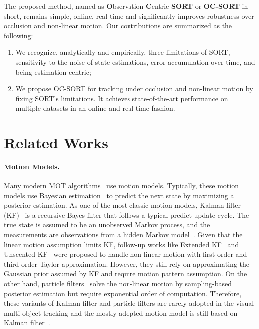 \documentclass[10pt,twocolumn,letterpaper]{article}
\begin{document}
The proposed method, named as \textbf{O}bservation-\textbf{C}entric \textbf{SORT} or \textbf{OC-SORT} in short, remains simple, online, real-time and significantly improves robustness over occlusion and non-linear motion.
Our contributions are summarized as the following: 
\begin{enumerate}
    \item We recognize, analytically and empirically, three limitations of SORT, \ie sensitivity to the noise of state estimations, error accumulation over time, and being estimation-centric; 
    \item We propose OC-SORT for tracking under occlusion and non-linear motion by fixing SORT's limitations. It achieves state-of-the-art performance on multiple datasets in an online and real-time fashion.
\end{enumerate}

\section{Related Works}
\paragraph{Motion Models.} Many modern MOT algorithms~\cite{bewley2016simple,tusimple,deepsort,centertrack,bytetrack} use motion models. Typically, these motion models use Bayesian estimation~\cite{bayes} to predict the next state by maximizing a posterior estimation. As one of the most classic motion models, Kalman filter (KF)~\cite{kalman1960contributions} is a recursive Bayes filter that follows a typical predict-update cycle. The true state is assumed to be an unobserved Markov process, and the measurements are observations from a hidden Markov model~\cite{hmm}.
Given that the linear motion assumption limits KF, follow-up works like Extended KF~\cite{ekf} and Unscented KF~\cite{ukf} were proposed to handle non-linear motion with first-order and third-order Taylor approximation. However, they still rely on approximating the Gaussian prior assumed by KF and require motion pattern assumption. 
On the other hand, particle filters~\cite{pf} solve the non-linear motion by sampling-based posterior estimation but require exponential order of computation. Therefore, these variants of Kalman filter and particle filters are rarely adopted in the visual multi-object tracking and the mostly adopted motion model is still based on Kalman filter~\citep{bewley2016simple}.

\vspace{-0.5cm}
\end{document}
